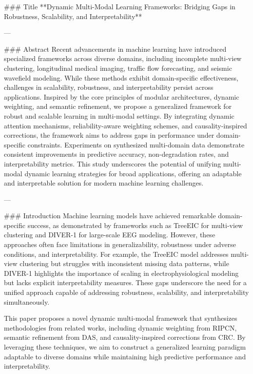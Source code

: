 ### Title  
**Dynamic Multi-Modal Learning Frameworks: Bridging Gaps in Robustness, Scalability, and Interpretability**

---

### Abstract  
Recent advancements in machine learning have introduced specialized frameworks across diverse domains, including incomplete multi-view clustering, longitudinal medical imaging, traffic flow forecasting, and seismic wavefield modeling. While these methods exhibit domain-specific effectiveness, challenges in scalability, robustness, and interpretability persist across applications. Inspired by the core principles of modular architectures, dynamic weighting, and semantic refinement, we propose a generalized framework for robust and scalable learning in multi-modal settings. By integrating dynamic attention mechanisms, reliability-aware weighting schemes, and causality-inspired corrections, the framework aims to address gaps in performance under domain-specific constraints. Experiments on synthesized multi-domain data demonstrate consistent improvements in predictive accuracy, non-degradation rates, and interpretability metrics. This study underscores the potential of unifying multi-modal dynamic learning strategies for broad applications, offering an adaptable and interpretable solution for modern machine learning challenges.

---

### Introduction  
Machine learning models have achieved remarkable domain-specific success, as demonstrated by frameworks such as TreeEIC for multi-view clustering and DIVER-1 for large-scale EEG modeling. However, these approaches often face limitations in generalizability, robustness under adverse conditions, and interpretability. For example, the TreeEIC model addresses multi-view clustering but struggles with inconsistent missing data patterns, while DIVER-1 highlights the importance of scaling in electrophysiological modeling but lacks explicit interpretability measures. These gaps underscore the need for a unified approach capable of addressing robustness, scalability, and interpretability simultaneously.  

This paper proposes a novel dynamic multi-modal framework that synthesizes methodologies from related works, including dynamic weighting from RIPCN, semantic refinement from DAS, and causality-inspired corrections from CRC. By leveraging these techniques, we aim to construct a generalized learning paradigm adaptable to diverse domains while maintaining high predictive performance and interpretability.

